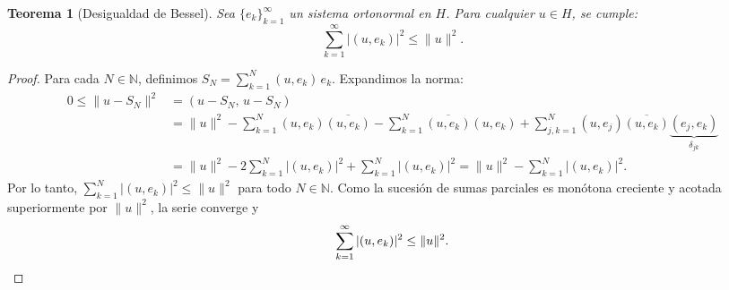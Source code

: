 \documentclass[a4paper,11pt]{report}
\newtheorem{theorem}{Teorema}[chapter]
\newtheorem{definition}[theorem]{Definición}
\newtheorem{example}[theorem]{Ejemplo}
\begin{document}







\begin{theorem}[Desigualdad de Bessel]\label{thm:bessel}
Sea $\{e_k\}_{k=1}^\infty$ un sistema ortonormal en $H$. Para cualquier $u \in H$, se cumple:
\[ \sum_{k=1}^\infty |(u, e_k)|^2 \leq \|u\|^2. \]
\end{theorem}

\begin{proof}
Para cada $N \in \mathbb{N}$, definimos $S_N = \sum_{k=1}^N (u, e_k)\, e_k$. Expandimos la norma:
\begin{align*}
0 \leq \|u - S_N\|^2 &= (u - S_N,\, u - S_N) \\
&= \|u\|^2 - \sum_{k=1}^N (u, e_k)\overline{(u, e_k)} - \sum_{k=1}^N \overline{(u, e_k)}(u, e_k) + \sum_{j,k=1}^N (u, e_j)\overline{(u, e_k)}\underbrace{(e_j, e_k)}_{\delta_{jk}} \\
&= \|u\|^2 - 2\sum_{k=1}^N |(u, e_k)|^2 + \sum_{k=1}^N |(u, e_k)|^2 = \|u\|^2 - \sum_{k=1}^N |(u, e_k)|^2.
\end{align*}
Por lo tanto, $\sum_{k=1}^N |(u, e_k)|^2 \leq \|u\|^2$ para todo $N \in \mathbb{N}$. Como la sucesión de sumas parciales es monótona creciente y acotada superiormente por $\|u\|^2$, la serie converge y
\[ \sum_{k=1}^\infty |(u, e_k)|^2 \leq \|u\|^2. \qedhere \]
\end{proof}
\end{document}
